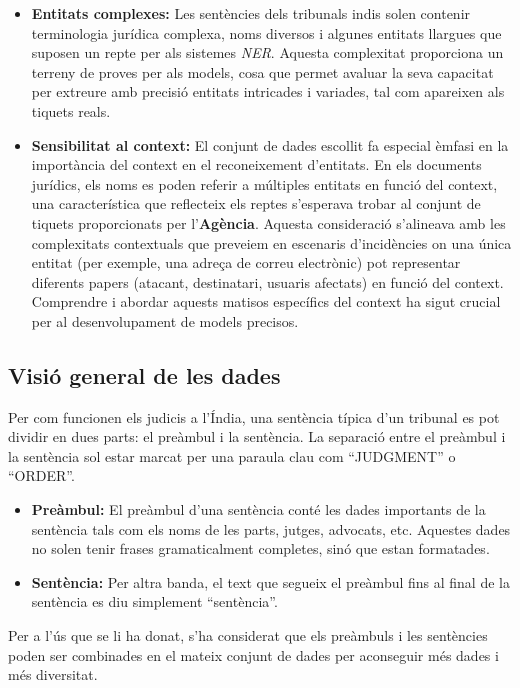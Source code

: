 \begin{itemize}
  \item \textbf{Entitats complexes:} Les sentències dels tribunals indis solen contenir terminologia jurídica complexa, noms diversos i algunes entitats llargues que suposen un repte per als sistemes \textit{NER}. Aquesta complexitat proporciona un terreny de proves per als models, cosa que permet avaluar la seva capacitat per extreure amb precisió entitats intricades i variades, tal com apareixen als tiquets reals.
  \item \textbf{Sensibilitat al context:} El conjunt de dades escollit fa especial èmfasi en la importància del context en el reconeixement d'entitats. En els documents jurídics, els noms es poden referir a múltiples entitats en funció del context, una característica que reflecteix els reptes s'esperava trobar al conjunt de tiquets proporcionats per l'\textbf{Agència}. Aquesta consideració s'alineava amb les complexitats contextuals que preveiem en escenaris d'incidències on una única entitat (per exemple, una adreça de correu electrònic) pot representar diferents papers (atacant, destinatari, usuaris afectats) en funció del context. Comprendre i abordar aquests matisos específics del context ha sigut crucial per al desenvolupament de models precisos.
\end{itemize}


\subsection{Visió general de les dades}
Per com funcionen els judicis a l'Índia, una sentència típica d'un tribunal es pot dividir en dues parts: el preàmbul i la sentència. La separació entre el preàmbul i la sentència sol estar marcat per una paraula clau com ``JUDGMENT'' o ``ORDER''. 
\begin{itemize}
  \item \textbf{Preàmbul:} El preàmbul d'una sentència conté les dades importants de la sentència tals com els noms de les parts, jutges, advocats, etc. Aquestes dades no solen tenir frases gramaticalment completes, sinó que estan formatades.
  \item \textbf{Sentència:} Per altra banda, el text que segueix el preàmbul fins al final de la sentència es diu simplement ``sentència''.
\end{itemize}
Per a l'ús que se li ha donat, s'ha considerat que els preàmbuls i les sentències poden ser combinades en el mateix conjunt de dades per aconseguir més dades i més diversitat.

